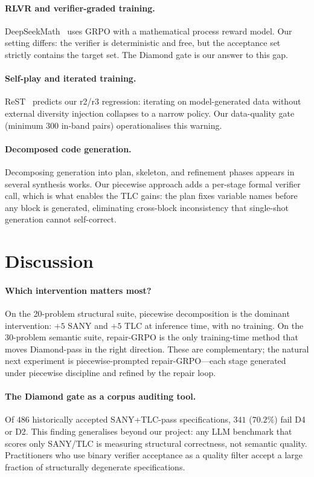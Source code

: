 \documentclass[10pt,twocolumn]{article}
\begin{document}
\paragraph{RLVR and verifier-graded training.}
DeepSeekMath~\cite{shao2024deepseekmath} uses GRPO with a mathematical
process reward model.
Our setting differs: the verifier is deterministic and free, but the
acceptance set strictly contains the target set.
The Diamond gate is our answer to this gap.

\paragraph{Self-play and iterated training.}
ReST~\cite{gulcehre2023rest} predicts our r2/r3 regression: iterating on
model-generated data without external diversity injection collapses to a
narrow policy.
Our data-quality gate (minimum $300$ in-band pairs) operationalises this
warning.

\paragraph{Decomposed code generation.}
Decomposing generation into plan, skeleton, and refinement phases appears
in several synthesis works.
Our piecewise approach adds a per-stage formal verifier call, which is what
enables the TLC gains: the plan fixes variable names before any block is
generated, eliminating cross-block inconsistency that single-shot generation
cannot self-correct.

\section{Discussion}
\label{sec:discussion}

\paragraph{Which intervention matters most?}
On the 20-problem structural suite, piecewise decomposition is the dominant
intervention: $+5$ SANY and $+5$ TLC at inference time, with no training.
On the 30-problem semantic suite, repair-GRPO is the only training-time
method that moves Diamond-pass in the right direction.
These are complementary; the natural next experiment is piecewise-prompted
repair-GRPO---each stage generated under piecewise discipline and refined by
the repair loop.

\paragraph{The Diamond gate as a corpus auditing tool.}
Of $486$ historically accepted SANY+TLC-pass specifications, $341$ ($70.2\%$)
fail D4 or D2.
This finding generalises beyond our project: any LLM benchmark that scores
only SANY/TLC is measuring structural correctness, not semantic quality.
Practitioners who use binary verifier acceptance as a quality filter accept a
large fraction of structurally degenerate specifications.
\end{document}
